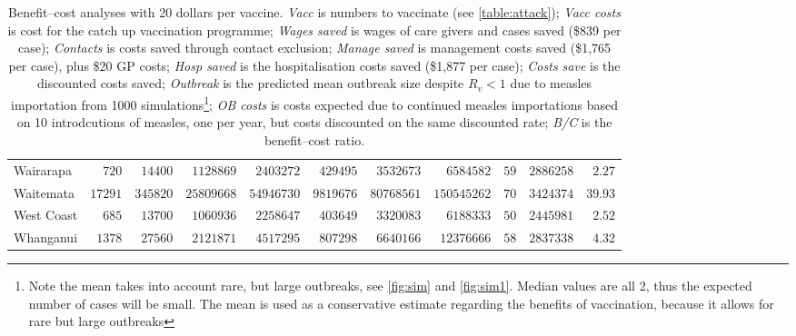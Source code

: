 \documentclass{article}
\begin{document}
\begin{table}
\begin{center}
\begin{tabular}{lrrrrrrrrrr}
Wairarapa&$  720$&$ 14400$&$ 1128869$&$ 2403272$&$  429495$&$ 3532673$&$  6584582$&$ 59$&$2886258$&$ 2.27$\tabularnewline
Waitemata&$17291$&$345820$&$25809668$&$54946730$&$ 9819676$&$80768561$&$150545262$&$ 70$&$3424374$&$39.93$\tabularnewline
West Coast&$  685$&$ 13700$&$ 1060936$&$ 2258647$&$  403649$&$ 3320083$&$  6188333$&$ 50$&$2445981$&$ 2.52$\tabularnewline
Whanganui&$ 1378$&$ 27560$&$ 2121871$&$ 4517295$&$  807298$&$ 6640166$&$ 12376666$&$ 58$&$2837338$&$ 4.32$\tabularnewline
\hline
\end{tabular}\end{center}\caption{Benefit--cost analyses with 20 dollars per vaccine. \textit{Vacc} is numbers to vaccinate (see \autoref{table:attack}); \textit{Vacc costs} is cost for the catch up vaccination programme; \textit{Wages saved} is wages of care givers and cases saved (\$839 per case); \textit{Contacts} is costs saved through contact exclusion; \textit{Manage saved} is management costs saved (\$1,765 per case), plus \$20 GP costs; \textit{Hosp saved} is the hospitalisation costs saved (\$1,877 per case); \textit{Costs save}  is the discounted costs saved; \textit{Outbreak}	is the predicted mean outbreak size despite $R_v < 1$ due to measles importation from 1000 simulations\footnote{Note the mean takes into account rare, but large outbreaks, see \autoref{fig:sim} and \autoref{fig:sim1}. Median values are all 2, thus the expected number of cases will be small. The mean is used as a conservative estimate regarding the benefits of vaccination, because it allows for rare but large outbreaks}; \textit{OB costs}	is costs expected due to continued measles importations based on 10 introdcutions of measles, one per year, but costs discounted on the same discounted rate; \textit{B/C} is the benefit--cost ratio.}
\label{table:cost20}
\end{table}
\end{document}
